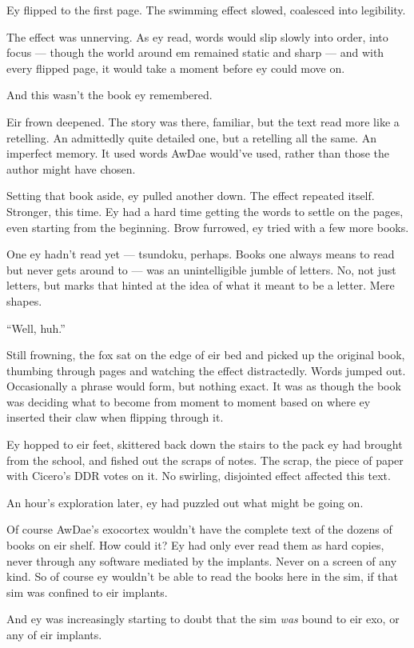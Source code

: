 Ey flipped to the first page. The swimming effect slowed, coalesced into legibility.

The effect was unnerving. As ey read, words would slip slowly into order, into focus — though the world around em remained static and sharp — and with every flipped page, it would take a moment before ey could move on.

And this wasn't the book ey remembered.

Eir frown deepened. The story was there, familiar, but the text read more like a retelling. An admittedly quite detailed one, but a retelling all the same. An imperfect memory. It used words AwDae would've used, rather than those the author might have chosen.

Setting that book aside, ey pulled another down. The effect repeated itself. Stronger, this time. Ey had a hard time getting the words to settle on the pages, even starting from the beginning. Brow furrowed, ey tried with a few more books.

One ey hadn't read yet — tsundoku, perhaps. Books one always means to read but never gets around to — was an unintelligible jumble of letters. No, not just letters, but marks that hinted at the idea of what it meant to be a letter. Mere shapes.

``Well, huh.''

Still frowning, the fox sat on the edge of eir bed and picked up the original book, thumbing through pages and watching the effect distractedly. Words jumped out. Occasionally a phrase would form, but nothing exact. It was as though the book was deciding what to become from moment to moment based on where ey inserted their claw when flipping through it.

Ey hopped to eir feet, skittered back down the stairs to the pack ey had brought from the school, and fished out the scraps of notes. The scrap, the piece of paper with Cicero's DDR votes on it. No swirling, disjointed effect affected this text.

An hour's exploration later, ey had puzzled out what might be going on.

Of course AwDae's exocortex wouldn't have the complete text of the dozens of books on eir shelf. How could it? Ey had only ever read them as hard copies, never through any software mediated by the implants. Never on a screen of any kind. So of course ey wouldn't be able to read the books here in the sim, if that sim was confined to eir implants.

And ey was increasingly starting to doubt that the sim \emph{was} bound to eir exo, or any of eir implants.

